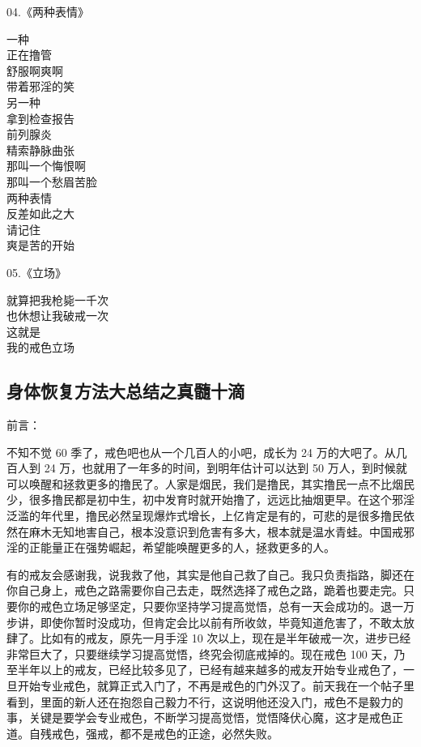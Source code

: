 \documentclass{ctexart}
\begin{document}
\begin{multicols}{2}
    \begin{center}
        04.《两种表情》\it

        一种 \\ 正在撸管 \\ 舒服啊爽啊 \\ 带着邪淫的笑
        ~\\
        另一种 \\ 拿到检查报告 \\ 前列腺炎 \\ 精索静脉曲张 \\ 那叫一个悔恨啊 \\ 那叫一个愁眉苦脸
        ~\\
        两种表情 \\ 反差如此之大 \\ 请记住 \\ 爽是苦的开始
    \end{center}

    \begin{center}
        05.《立场》\it

        就算把我枪毙一千次 \\ 也休想让我破戒一次 \\ 这就是 \\ 我的戒色立场
    \end{center}
\end{multicols}

\subsection{身体恢复方法大总结之真髓十滴}

前言：

不知不觉 60 季了，戒色吧也从一个几百人的小吧，成长为 24 万的大吧了。从几百人到 24 万，也就用了一年多的时间，到明年估计可以达到 50 万人，到时候就可以唤醒和拯救更多的撸民了。人家是烟民，我们是撸民，其实撸民一点不比烟民少，很多撸民都是初中生，初中发育时就开始撸了，远远比抽烟更早。在这个邪淫泛滥的年代里，撸民必然呈现爆炸式增长，上亿肯定是有的，可悲的是很多撸民依然在麻木无知地害自己，根本没意识到危害有多大，根本就是温水青蛙。中国戒邪淫的正能量正在强势崛起，希望能唤醒更多的人，拯救更多的人。

有的戒友会感谢我，说我救了他，其实是他自己救了自己。我只负责指路，脚还在你自己身上，戒色之路需要你自己去走，既然选择了戒色之路，跪着也要走完。只要你的戒色立场足够坚定，只要你坚持学习提高觉悟，总有一天会成功的。退一万步讲，即使你暂时没成功，但肯定会比以前有所收敛，毕竟知道危害了，不敢太放肆了。比如有的戒友，原先一月手淫 10 次以上，现在是半年破戒一次，进步已经非常巨大了，只要继续学习提高觉悟，终究会彻底戒掉的。现在戒色 100 天，乃至半年以上的戒友，已经比较多见了，已经有越来越多的戒友开始专业戒色了，一旦开始专业戒色，就算正式入门了，不再是戒色的门外汉了。前天我在一个帖子里看到，里面的新人还在抱怨自己毅力不行，这说明他还没入门，戒色不是毅力的事，关键是要学会专业戒色，不断学习提高觉悟，觉悟降伏心魔，这才是戒色正道。自残戒色，强戒，都不是戒色的正途，必然失败。
\end{document}
